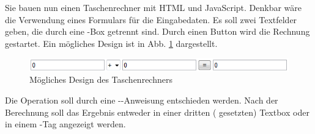 %
\par Sie bauen nun einen Taschenrechner mit HTML und JavaScript. Denkbar wäre die Verwendung eines Formulars für die Eingabedaten. Es soll zwei Textfelder geben, die durch eine -Box getrennt sind. Durch einen Button wird die Rechnung gestartet. Ein mögliches Design ist in Abb. \ref{fig:calculator} dargestellt.
%
\begin{figure}[!h]
\centering
\includegraphics{Figures/calculator.png}
\caption{Mögliches Design des Taschenrechners}
\label{fig:calculator}
\end{figure}
%
\par Die Operation soll durch eine --Anweisung entschieden werden. Nach der Berechnung soll das Ergebnis entweder in einer dritten ( gesetzten) Textbox oder in einem -Tag angezeigt werden.